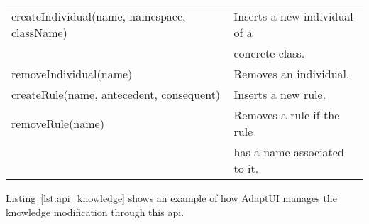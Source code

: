 \begin{center}
\begin{longtable}{l l}
  \hline 
  createIndividual(name, namespace, className)& Inserts a new individual of a \\
					& concrete class.		\\
  removeIndividual(name)	 	& Removes an individual.	\\

  \hline 
  createRule(name, antecedent, consequent)& Inserts a new rule.		\\
  removeRule(name)	 		& Removes a rule if the rule 	\\
					& has a name associated to it.	\\
  \hline
\end{longtable}
\end{center}

Listing~\ref{lst:api_knowledge} shows an example of how AdaptUI manages the
knowledge modification through this \ac{api}. 


\inputminted[linenos=true, fontsize=\footnotesize, frame=lines]{java}{4_system_architecture/api_knowledge.java}
